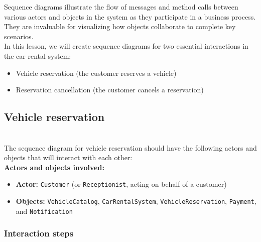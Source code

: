 

Sequence diagrams illustrate the flow of messages and method calls between various actors and objects in the system as they participate in a business process. They are invaluable for visualizing how objects collaborate to complete key scenarios.
\\
In this lesson, we will create sequence diagrams for two essential interactions in the car rental system:

\begin{itemize}
\item
\protect{}\label{jQbYjt592pl8TSK3WjCAj}
Vehicle reservation (the customer reserves a vehicle)
\item
\protect{}\label{pSp67cyccj959k-oyTTNK}
Reservation cancellation (the customer cancels a reservation)
\end{itemize}

\subsection{Vehicle reservation}\label{sqMKRH7fvLTFXNz_Ko22T}
\\
The sequence diagram for vehicle reservation should have the following actors and objects that will interact with each other:
\\
\textbf{Actors and objects involved:}

\begin{itemize}
\item
\protect{}\label{FoC2UbwwwRlInM9pFW8FW}
\textbf{Actor:} \texttt{Customer} (or \texttt{Receptionist}, acting on behalf of a customer)
\item
\protect{}\label{-uQJ03e4is6RUiazkGUpl}
\textbf{Objects:} \texttt{VehicleCatalog}, \texttt{CarRentalSystem}, \texttt{VehicleReservation}, \texttt{Payment}, and \texttt{Notification}
\end{itemize}

\subsubsection{Interaction steps}\label{qD9qzfmW4leD1MqsBw3tN}

